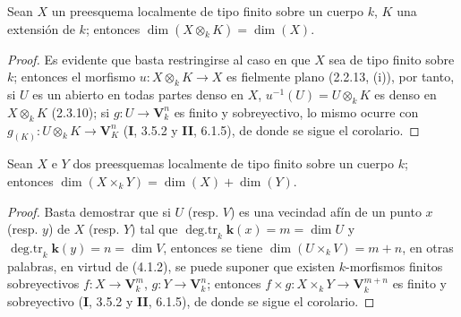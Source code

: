 \begin{corollary}[4.1.4]
\label{IV.2.4.1.4-fr}
Sean $X$ un preesquema localmente de tipo finito sobre un cuerpo $k$, $K$ una
extensión de $k$; entonces $\dim(X\otimes_k K)=\dim(X)$.
\end{corollary}

\begin{proof}
Es evidente que basta restringirse al caso en que $X$ sea de tipo finito sobre
$k$; entonces el morfismo $u:X\otimes_k K\to X$ es fielmente plano (2.2.13,
(i)), por tanto, si $U$ es un abierto en todas partes denso en $X$,
$u^{-1}(U)=U\otimes_k K$ es denso en $X\otimes_k K$ (2.3.10); si
$g:U\to\mathbf V_k^n$ es finito y sobreyectivo, lo mismo ocurre con
$g_{(K)}:U\otimes_k K\to\mathbf V_K^n$ (\textbf I, 3.5.2 y \textbf{II}, 6.1.5), de donde se
 sigue el corolario.
\end{proof}

\begin{corollary}[4.1.5]
\label{IV.2.4.1.5-fr}
Sean $X$ e $Y$ dos preesquemas localmente de tipo finito sobre un cuerpo $k$;
entonces $\dim(X\times_k Y)=\dim(X)+\dim(Y)$.
\end{corollary}

\begin{proof}
Basta demostrar que si $U$ (resp. $V$) es una vecindad afín de un punto $x$
(resp. $y$) de $X$ (resp. $Y$) tal que
$\operatorname{deg.tr}_k \boldsymbol{k}(x)=m=\dim U$ y
$\operatorname{deg.tr}_k \boldsymbol{k}(y)=n=\dim V$, entonces se tiene
$\dim(U\times_k V)=m+n$, en otras palabras, en virtud de (4.1.2), se puede
suponer que existen $k$-morfismos finitos sobreyectivos
$f:X\to\mathbf V_k^m$, $g:Y\to\mathbf V_k^n$; entonces
$f\times g:X\times_k Y\to\mathbf V_k^{m+n}$ es finito y sobreyectivo
(\textbf I, 3.5.2 y \textbf{II}, 6.1.5), de donde se sigue el corolario.
\end{proof}
